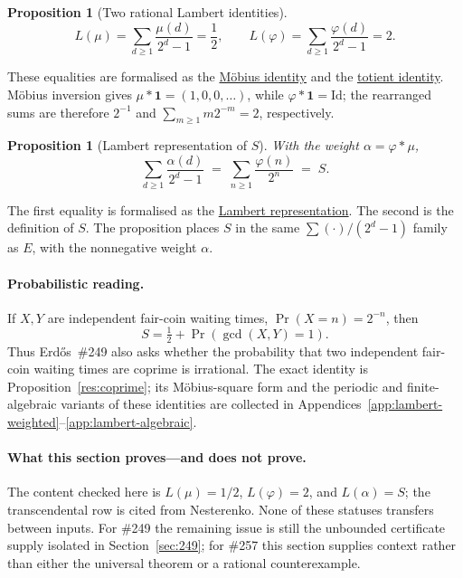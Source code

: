 \documentclass[11pt]{article}
\newcommand{\commit}{99f4bf47422abbd8757cbb22b50ba079d764d3a7}
\newcommand{\repobase}{https://github.com/wcook04/plectis-erdos/blob/\commit}
\newcommand{\PK}{Erdos249257}
\newcommand{\lword}[4]{\href{\repobase/\PK/#1\#L#2}{#4}}
\newtheorem{proposition}[theorem]{Proposition}
\theoremstyle{definition}
\theoremstyle{remark}
\newcommand{\ph}{\varphi}
\begin{document}
\begin{proposition}[Two rational Lambert identities]
\[
 L(\mu)=\sum_{d\ge1}\frac{\mu(d)}{2^d-1}=\frac12,
 \qquad
 L(\ph)=\sum_{d\ge1}\frac{\ph(d)}{2^d-1}=2.
\]
\end{proposition}
\noindent These equalities are formalised as the
\lword{MersenneLambertLadder.lean}{587}{tsum_moebius_div_two_pow_sub_one_eq_half}{M\"obius identity}
and the
\lword{MersenneLambertLadder.lean}{575}{tsum_totient_div_two_pow_sub_one_eq_two}{totient identity}.
M\"obius inversion gives \(\mu*\mathbf 1=(1,0,0,\ldots)\), while
\(\ph*\mathbf 1=\mathrm{Id}\); the rearranged sums are therefore
\(2^{-1}\) and \(\sum_{m\geq1}m2^{-m}=2\), respectively.

\begin{proposition}[Lambert representation of \(S\)]\label{res:lift}
With the weight $\alpha=\ph*\mu$,
\[
\sum_{d\ge1}\frac{\alpha(d)}{2^d-1}\;=\;\sum_{n\ge1}\frac{\ph(n)}{2^n}\;=\;S.
\]
\end{proposition}
\noindent The first equality is formalised as the
\lword{CertificateKernel.lean}{18445}{tsum_primWeight_div_two_pow_sub_one_eq_totient_series}{Lambert representation}.
The second is the definition of \(S\).  The proposition places \(S\) in the
same \(\sum(\cdot)/(2^d-1)\) family as \(E\), with the nonnegative weight
\(\alpha\).

\paragraph{Probabilistic reading.}
If \(X,Y\) are independent fair-coin waiting times,
\(\Pr(X=n)=2^{-n}\), then
\[
 S=\tfrac12+\Pr(\gcd(X,Y)=1).
\]
Thus Erd\H{o}s~\#249 also asks whether the probability that two independent
fair-coin waiting times are coprime is irrational.  The exact identity is
Proposition~\ref{res:coprime}; its M\"obius-square form and the periodic and
finite-algebraic variants of these identities are collected in
Appendices~\ref{app:lambert-weighted}--\ref{app:lambert-algebraic}.

\paragraph{What this section proves---and does not prove.}
The content checked here is
\(L(\mu)=1/2\), \(L(\ph)=2\), and \(L(\alpha)=S\); the transcendental row is
cited from Nesterenko.  None of these statuses transfers between inputs.  For
\#249 the remaining issue is still the unbounded certificate supply isolated
in Section~\ref{sec:249}; for \#257 this section supplies context rather than
either the universal theorem or a rational counterexample.
\end{document}
